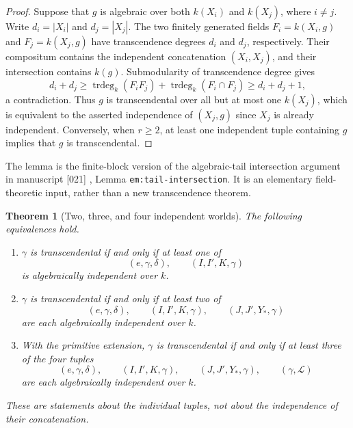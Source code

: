 \documentclass[11pt]{article}
\newtheorem{theorem}{Theorem}[section]
\theoremstyle{definition}
\theoremstyle{remark}
\begin{document}
\begin{proof}
Suppose that $g$ is algebraic over both $k(X_i)$ and $k(X_j)$,
where $i\ne j$. Write $d_i=|X_i|$ and $d_j=|X_j|$.
The two finitely generated fields
$F_i=k(X_i,g)$ and $F_j=k(X_j,g)$ have transcendence degrees
$d_i$ and $d_j$, respectively. Their compositum contains the
independent concatenation $(X_i,X_j)$, and their intersection
contains $k(g)$. Submodularity of transcendence degree gives
\[
 d_i+d_j
 \ge \operatorname{trdeg}_k(F_iF_j)
       +\operatorname{trdeg}_k(F_i\cap F_j)
 \ge d_i+d_j+1,
\]
a contradiction. Thus $g$ is transcendental over all but at most
one $k(X_j)$, which is equivalent to the asserted independence of
$(X_j,g)$ since $X_j$ is already independent. Conversely, when
$r\ge2$, at least one independent tuple containing $g$ implies that
$g$ is transcendental.
\end{proof}

The lemma is the finite-block version of the algebraic-tail
intersection argument in manuscript [021] \cite{Source021}, Lemma
\texttt{em:tail-intersection}. It is an elementary field-theoretic
input, rather than a new transcendence theorem.

\begin{theorem}[Two, three, and four independent worlds]
\label{gs:worlds}
The following equivalences hold.
\begin{enumerate}
\item $\gamma$ is transcendental if and only if at least one of
\[
 (e,\gamma,\delta),\qquad (I,I',K,\gamma)
\]
is algebraically independent over $k$.
\item $\gamma$ is transcendental if and only if at least two of
\[
 (e,\gamma,\delta),\qquad (I,I',K,\gamma),\qquad
 (J,J',Y_*,\gamma)
\]
are each algebraically independent over $k$.
\item With the primitive extension, $\gamma$ is transcendental if
and only if at least three of the four tuples
\begin{equation}\label{gs:four-worlds}
 (e,\gamma,\delta),\qquad (I,I',K,\gamma),\qquad
 (J,J',Y_*,\gamma),\qquad (\gamma,\mathcal L)
\end{equation}
are each algebraically independent over $k$.
\end{enumerate}
These are statements about the individual tuples, not about the
independence of their concatenation.
\end{theorem}
\end{document}

